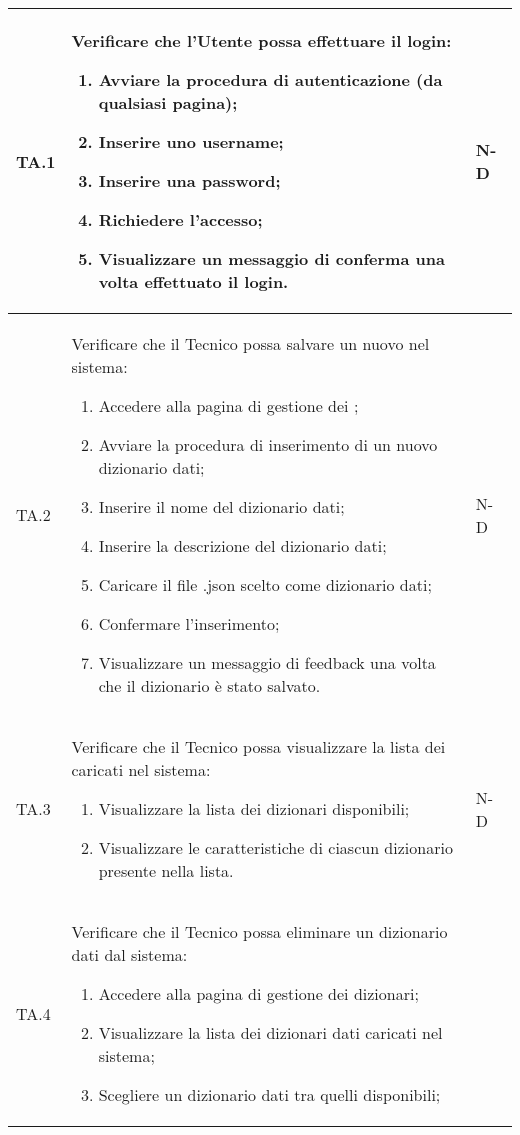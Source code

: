\begin{adjustwidth}{-0.5cm}{-0.5cm}
\begin{longtable}{|P{1.5cm}|>{\raggedright}P{9.5cm}|>{\arraybackslash}P{1.5cm}|}
		TA.1 & Verificare che l'Utente possa effettuare il login:
		\begin{enumerate}
			\item Avviare la procedura di autenticazione (da qualsiasi pagina);
			\item Inserire uno username;
			\item Inserire una password;
			\item Richiedere l'accesso;
			\item Visualizzare un messaggio di conferma una volta effettuato il login.
		\end{enumerate}
		& N-D \\
		\hline TA.2 & Verificare che il Tecnico possa salvare un nuovo  nel sistema:
		\begin{enumerate}
			\item Accedere alla pagina di gestione dei ;
			\item Avviare la procedura di inserimento di un nuovo dizionario dati;
			\item Inserire il nome del dizionario dati;
			\item Inserire la descrizione del dizionario dati;
			\item Caricare il file .json scelto come dizionario dati;
			\item Confermare l'inserimento;
			\item Visualizzare un messaggio di feedback una volta che il dizionario è stato salvato.
		\end{enumerate}
		& N-D \\
		\hline TA.3 & Verificare che il Tecnico possa visualizzare la lista dei  caricati nel sistema:
		\begin{enumerate}
			\item Visualizzare la lista dei dizionari disponibili;
			\item Visualizzare le caratteristiche di ciascun dizionario presente nella lista.
		\end{enumerate}
		& N-D \\
		\hline TA.4 & Verificare che il Tecnico possa eliminare un dizionario dati dal sistema:
		\begin{enumerate}
			\item Accedere alla pagina di gestione dei dizionari;
			\item Visualizzare la lista dei dizionari dati caricati nel sistema;
			\item Scegliere un dizionario dati tra quelli disponibili;

\end{enumerate}
\end{longtable}
\end{adjustwidth}
